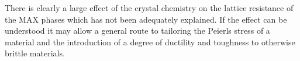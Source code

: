 There is clearly a large effect of the crystal chemistry on the lattice resistance of the MAX phases which has not been adequately explained. If the effect can be understood it may allow a general route to tailoring the Peierls stress of a material and the introduction of a degree of ductility and toughness to otherwise brittle materials.
























































